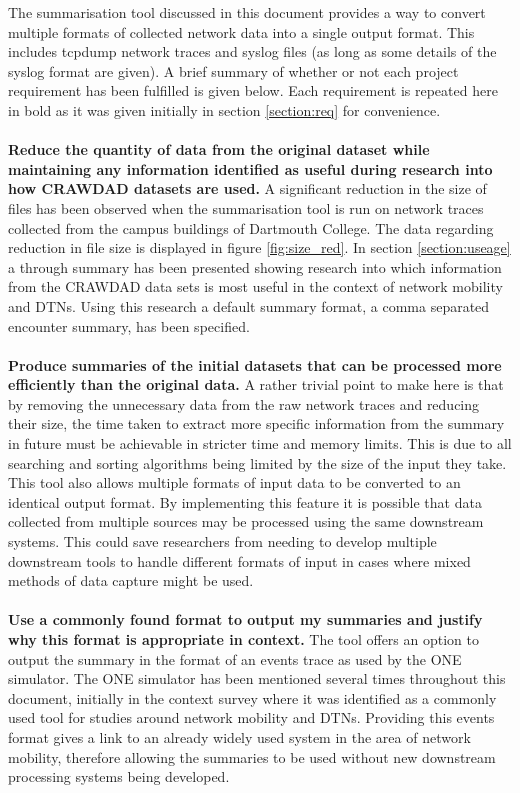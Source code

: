 The summarisation tool discussed in this document provides a way to convert multiple formats of collected network data into a single output format. This includes tcpdump network traces and syslog files (as long as some details of the syslog format are given). A brief summary of whether or not each project requirement has been fulfilled is given below. Each requirement is repeated here in bold as it was given initially in section \ref{section:req} for convenience.
\\\\
\textbf{Reduce the quantity of data from the original dataset while maintaining any information identified as useful during research into how CRAWDAD datasets are used.}
A significant reduction in the size of files has been observed when the summarisation tool is run on network traces collected from the campus buildings of Dartmouth College. The data regarding reduction in file size is displayed in figure \ref{fig:size_red}. In section \ref{section:useage} a through summary has been presented showing research into which information from the CRAWDAD data sets is most useful in the context of network mobility and DTNs. Using this research a default summary format, a comma separated encounter summary, has been specified.
\\\\
\textbf{Produce summaries of the initial datasets that can be processed more efficiently than the original data.}
A rather trivial point to make here is that by removing the unnecessary data from the raw network traces and reducing their size, the time taken to extract more specific information from the summary in future must be achievable in stricter time and memory limits. This is due to all searching and sorting algorithms being limited by the size of the input they take. 
This tool also allows multiple formats of input data to be converted to an identical output format. By implementing this feature it is possible that data collected from multiple sources may be processed using the same downstream systems. This could save researchers from needing to develop multiple downstream tools to handle different formats of input in cases where mixed methods of data capture might be used.
\\\\
\textbf{Use a commonly found format to output my summaries and justify why this format is appropriate in context.}
The tool offers an option to output the summary in the format of an events trace as used by the ONE simulator. The ONE simulator has been mentioned several times throughout this document, initially in the context survey where it was identified as a commonly used tool for studies around network mobility and DTNs. Providing this events format gives a link to an already widely used system in the area of network mobility, therefore allowing the summaries to be used without new downstream processing systems being developed.
